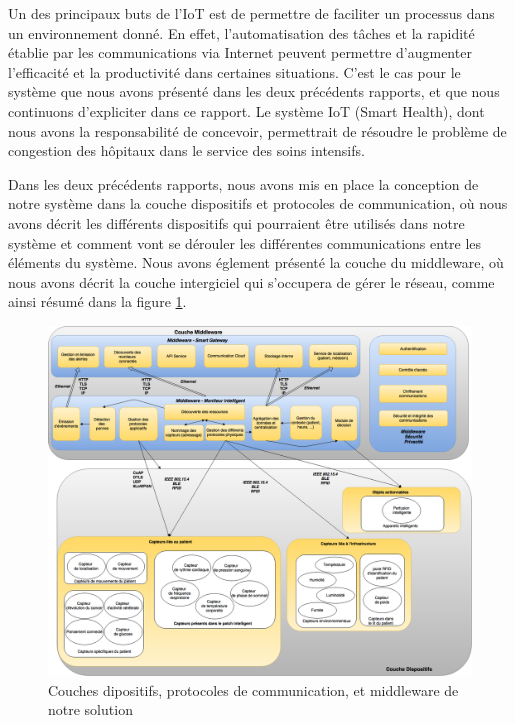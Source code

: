 Un des principaux buts de l’IoT est de permettre de faciliter un processus dans un environnement donné. En effet, l’automatisation
des tâches et la rapidité établie par les communications via Internet peuvent permettre d’augmenter l’efficacité et la
productivité dans certaines situations. C’est le cas pour le système que nous avons présenté dans les deux précédents rapports, et
que nous continuons d’expliciter dans ce rapport. Le système IoT (Smart Health), dont nous avons la responsabilité de concevoir,
permettrait de résoudre le problème de congestion des hôpitaux dans le service des soins intensifs.  
\newline

Dans les deux précédents rapports, nous avons mis en place la conception de notre système dans la couche dispositifs et protocoles
de communication, où nous avons décrit les différents dispositifs qui pourraient être utilisés dans notre système et comment vont
se dérouler les différentes communications entre les éléments du système. Nous avons églement présenté la couche du middleware, où nous avons
décrit la couche intergiciel qui s’occupera de gérer le réseau, comme ainsi résumé dans la figure \ref{DispositifsMiddleware}.  
\newline
\begin{figure}[h!]
	\hspace*{-2.5cm}
	\centering
	\includegraphics[width=1.4\textwidth]{DispositifsMiddleware.png}
	\caption{Couches dipositifs, protocoles de communication, et middleware de notre solution}
	\label{DispositifsMiddleware}
\end{figure}

